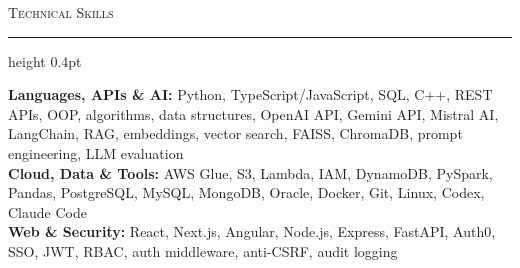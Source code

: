 \documentclass[letterpaper,11pt]{article}
\newcommand{\resumesection}[1]{%
  \par\vspace{2pt}%
  {\large\scshape #1}\par\vspace{2pt}%
  \hrule height 0.4pt\vspace{2pt}%
}
\begin{document}
\resumesection{Technical Skills}
\textbf{Languages, APIs \& AI:} Python, TypeScript/JavaScript, SQL, C++, REST APIs, OOP, algorithms, data structures, OpenAI API, Gemini API, Mistral AI, LangChain, RAG, embeddings, vector search, FAISS, ChromaDB, prompt engineering, LLM evaluation\\
\textbf{Cloud, Data \& Tools:} AWS Glue, S3, Lambda, IAM, DynamoDB, PySpark, Pandas, PostgreSQL, MySQL, MongoDB, Oracle, Docker, Git, Linux, Codex, Claude Code\\
\textbf{Web \& Security:} React, Next.js, Angular, Node.js, Express, FastAPI, Auth0, SSO, JWT, RBAC, auth middleware, anti-CSRF, audit logging
\end{document}
